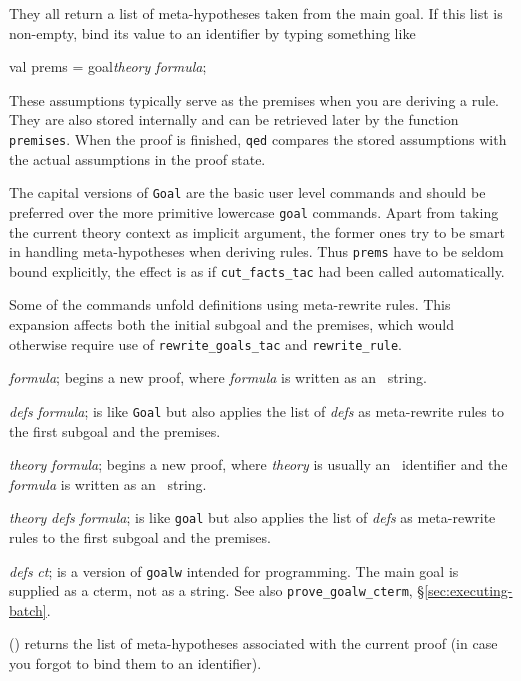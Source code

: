 They all return a list of meta-hypotheses taken from the main goal.  If
this list is non-empty, bind its value to an \ML{} identifier by typing
something like
\begin{ttbox} 
val prems = goal{\it theory\/ formula};
\end{ttbox}
These assumptions typically serve as the premises when you are
deriving a rule.  They are also stored internally and can be retrieved
later by the function \texttt{premises}.  When the proof is finished,
\texttt{qed} compares the stored assumptions with the actual
assumptions in the proof state.

The capital versions of \texttt{Goal} are the basic user level
commands and should be preferred over the more primitive lowercase
\texttt{goal} commands.  Apart from taking the current theory context
as implicit argument, the former ones try to be smart in handling
meta-hypotheses when deriving rules.  Thus \texttt{prems} have to be
seldom bound explicitly, the effect is as if \texttt{cut_facts_tac}
had been called automatically.

Some of the commands unfold definitions using meta-rewrite rules.  This
expansion affects both the initial subgoal and the premises, which would
otherwise require use of \texttt{rewrite_goals_tac} and
\texttt{rewrite_rule}.

\begin{ttdescription}
\item[\ttindexbold{Goal} {\it formula};] begins a new proof, where
  {\it formula\/} is written as an \ML\ string.
  
\item[\ttindexbold{Goalw} {\it defs} {\it formula};] is like
  \texttt{Goal} but also applies the list of {\it defs\/} as
  meta-rewrite rules to the first subgoal and the premises.

\item[\ttindexbold{goal} {\it theory} {\it formula};] 
begins a new proof, where {\it theory} is usually an \ML\ identifier
and the {\it formula\/} is written as an \ML\ string.

\item[\ttindexbold{goalw} {\it theory} {\it defs} {\it formula};] 
is like \texttt{goal} but also applies the list of {\it defs\/} as
meta-rewrite rules to the first subgoal and the premises.

\item[\ttindexbold{goalw_cterm} {\it defs} {\it ct};] is
  a version of \texttt{goalw} intended for programming.  The main
  goal is supplied as a cterm, not as a string.  See also
  \texttt{prove_goalw_cterm}, \S\ref{sec:executing-batch}. 

\item[\ttindexbold{premises}()] 
returns the list of meta-hypotheses associated with the current proof (in
case you forgot to bind them to an \ML{} identifier).
\end{ttdescription}


